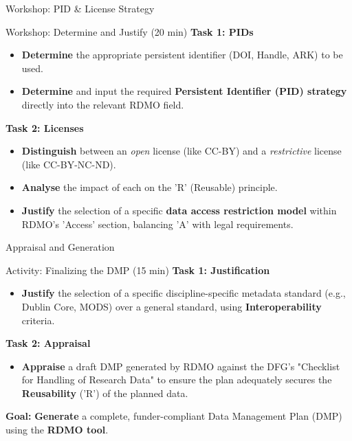 \documentclass{integrity} %
\begin{document}
\begin{frame}{Workshop: PID \& License Strategy}
    \begin{block}{Workshop: Determine and Justify (20 min)}
        \textbf{Task 1: PIDs}
        \begin{itemize}
            \item \textbf{Determine} the appropriate persistent identifier (DOI, Handle, ARK) to be used.
            \item \textbf{Determine} and input the required \textbf{Persistent Identifier (PID) strategy} directly into the relevant RDMO field.
        \end{itemize}
        \pause
        \textbf{Task 2: Licenses}
        \begin{itemize}
            \item \textbf{Distinguish} between an \emph{open} license (like CC-BY) and a \emph{restrictive} license (like CC-BY-NC-ND).
            \item \textbf{Analyse} the impact of each on the 'R' (Reusable) principle.
            \item \textbf{Justify} the selection of a specific \textbf{data access restriction model} within RDMO's 'Access' section, balancing 'A' with legal requirements.
        \end{itemize}
    \end{block}
\end{frame}

\begin{frame}{Appraisal and Generation}
    \begin{block}{Activity: Finalizing the DMP (15 min)}
        \textbf{Task 1: Justification}
        \begin{itemize}
            \item \textbf{Justify} the selection of a specific discipline-specific metadata standard (e.g., Dublin Core, MODS) over a general standard, using \textbf{Interoperability} criteria.
        \end{itemize}
        \pause
        \textbf{Task 2: Appraisal}
        \begin{itemize}
            \item \textbf{Appraise} a draft DMP generated by RDMO against the DFG's "Checklist for Handling of Research Data" to ensure the plan adequately secures the \textbf{Reusability} ('R') of the planned data.
        \end{itemize}
        \pause
        \textbf{Goal:} \textbf{Generate} a complete, funder-compliant Data Management Plan (DMP) using the \textbf{RDMO tool}.
    \end{block}
\end{frame}
\end{document}
